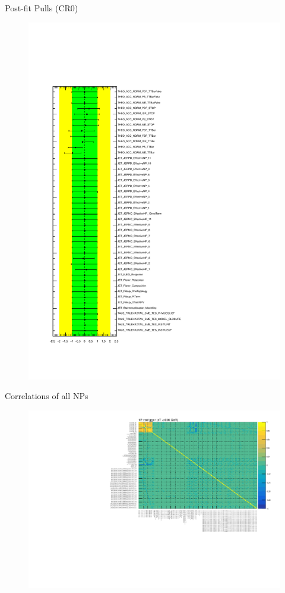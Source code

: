 \documentclass[aspectratio=46, dvipdfmx, 10pt, t]{beamer} %
\begin{document}
\begin{frame}{Post-fit Pulls (CR0)}
  \begin{figure}
    \includegraphics[scale=0.3]{pull_pulls_stLT600}
  \end{figure}
\end{frame}

\begin{frame}{Correlations of all NPs}
  \begin{figure}
    \setcounter{subfigure}{0}
    \centering
        \includegraphics[scale=0.55]{correlation_1P_notrigger_CR0}
  \end{figure}
\end{frame}
\end{document}
